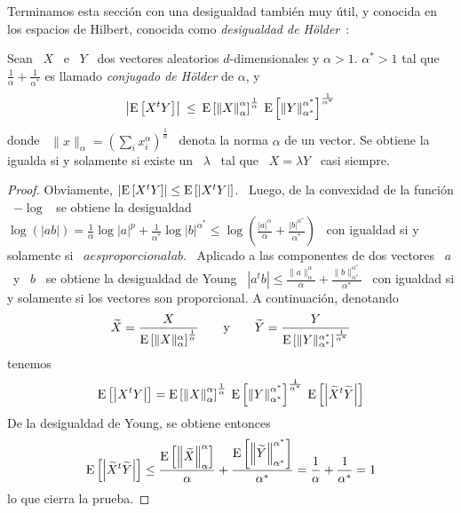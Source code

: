 {Terminamos esta secci\'on  con una desigualdad tambi\'en muy  \'util, y conocida
en   los   espacios   de    Hilbert,   conocida   como   {\it   desigualdad   de
  H\"older}~\cite{Hol98}:
%
\begin{teorema}
  Sean \ $X$ \  e \ $Y$ \ dos vectores aleatorios  $d$-dimensionales y $\alpha >
  1$. $\alpha^* >  1$ tal que $\frac1\alpha +  \frac1{\alpha^*}$ es llamado {\it
    conjugado de H\"older} de $\alpha$, y
  \[
  \left|  \operatorname{E}\left[  X^t Y  \right]  \right| \:  \le  \:  \operatorname{E}\left[ \left\|  X
    \right\|_\alpha^\alpha   \right]^{\frac1\alpha}  \:  \operatorname{E}\left[   \left\|  Y
    \right\|_{\alpha^*}^{\alpha^*} \right]^{\frac1{\alpha^*}}
  \]
  donde \ $\|  x \|_\alpha = \left( \sum_i  x_i^\alpha \right)^{\frac1\alpha}$ \
  denota la norma  $\alpha$ de un vector.  Se obtiene la  igualda si y solamente
  si existe un \ $\lambda$ \ tal que \ $X = \lambda Y$ \ casi siempre.
\end{teorema}
%
\begin{proof}
  Obviamente, $\left| \operatorname{E}\left[ X^t Y \right] \right| \le \operatorname{E}\left[ \left| X^t
      Y \right| \right]$. \ Luego, de  la convexidad de la funci\'on \ $-\log$ \
  se  obtiene  la  desigualdad  \  $\log(|a  b|) =  \frac1\alpha  \log  |a|^p  +
  \frac1{\alpha^*} \log  |b|^{\alpha^*} \le \log\left( \frac{|a|^\alpha}{\alpha}
    + \frac{|b|^{\alpha^*}}{\alpha^*} \right)$ \  con igualdad si y solamente si
  \ $a es proporcional a b$. \  Aplicado a las componentes de dos vectores \ $a$
  \ y  \ $b$ \ se  obtiene la desigualdad de  Young \ $\left| a^t  b \right| \le
  \frac{\|a\|_\alpha^\alpha}{\alpha}                                            +
  \frac{\|b\|_{\alpha^*}^{\alpha^*}}{\alpha^*}$ \ con igualdad si y solamente si
  los vectores son proporcional. A continuaci\'on, denotando
  \[
  \widetilde{X}         =         \frac{X}{\operatorname{E}\left[        \|X\|_\alpha^\alpha
    \right]^{\frac1\alpha}}    \qquad    \mbox{y}    \qquad   \widetilde{Y}    =
  \frac{Y}{\operatorname{E}\left[ \|Y\|_{\alpha^*}^{\alpha^*} \right]^{\frac1{\alpha^*}}}
  \]
  tenemos
  \[
  \operatorname{E}\left[   \left|   X^t  Y   \right|   \right]   =   \operatorname{E}\left[  \left\|   X
    \right\|_\alpha^\alpha   \right]^{\frac1\alpha}  \:  \operatorname{E}\left[   \left\|  Y
    \right\|_{\alpha^*}^{\alpha^*}   \right]^{\frac1{\alpha^*}}   \:  \operatorname{E}\left[
    \left| \widetilde{X}^t \widetilde{Y} \right| \right]
  \]
  De la desigualdad de Young, se obtiene entonces
  \[
  \operatorname{E}\left[   \left|   \widetilde{X}^t   \widetilde{Y}  \right|   \right]   \le
  \frac{\operatorname{E}\left[ \left\| \widetilde{X} \right\|_\alpha^\alpha \right]}{\alpha}
  +   \frac{\operatorname{E}\left[   \left\|  \widetilde{Y}   \right\|_{\alpha^*}^{\alpha^*}
    \right]}{\alpha^*} = \frac1\alpha + \frac1{\alpha^*} = 1
  \]
  lo que cierra la prueba.
\end{proof}

}
